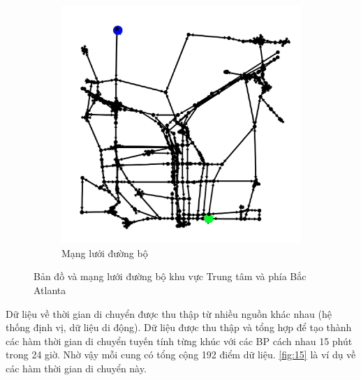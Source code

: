 \documentclass[../main.tex]{subfiles}
\begin{document}
\begin{figure}
\begin{subfigure}{0.5\textwidth}
        \includegraphics{edited-images/Figure14b.jpg}
        \caption{Mạng lưới đường bộ}
        \label{fig:14b}
    \end{subfigure}
    \caption{Bản đồ và mạng lưới đường bộ khu vực Trung tâm và phía Bắc Atlanta}
    \label{fig:14}
\end{figure}

Dữ liệu về thời gian di chuyển được thu thập từ nhiều nguồn khác nhau
(hệ thống định vị, dữ liệu di động). Dữ liệu được thu thập và tổng hợp
để tạo thành các hàm thời gian di chuyển tuyến tính từng khúc với các BP
cách nhau 15 phút trong 24 giờ. Nhờ vậy mỗi cung có tổng cộng 192 điểm
dữ liệu. \autoref{fig:15} là ví dụ về các hàm thời gian di chuyển
này.

\end{document}
